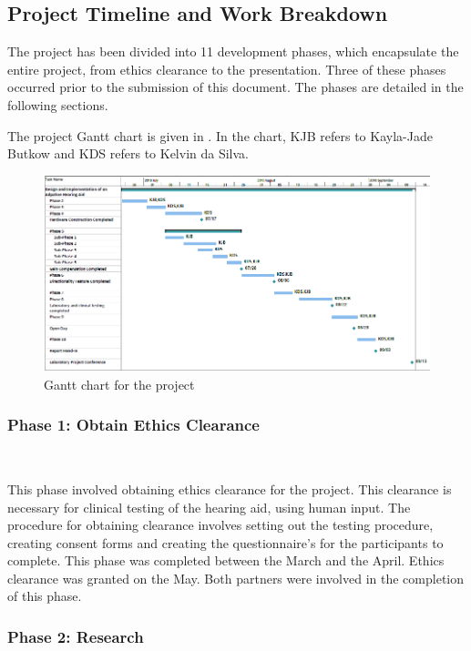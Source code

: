 \documentclass[10pt,twocolumn]{witseiepaper}
\begin{document}
\subsection{Project Timeline and Work Breakdown}
The project has been divided into 11 development phases, which encapsulate the entire project, from ethics clearance to the presentation. Three of these phases occurred prior to the submission of this document. The phases are detailed in the following sections.

The project Gantt chart is given in . In the chart, KJB refers to Kayla-Jade Butkow and KDS refers to Kelvin da Silva.

\begin{figure}[h]
	\centering
	\includegraphics[width=1\textwidth]{GanttChart.png}
	\caption{Gantt chart for the project}
	\raggedright
	\label{fig:ganttChart}	
\end{figure}

\subsubsection*{Phase 1: Obtain Ethics Clearance} $    $

This phase involved obtaining ethics clearance for the project. This clearance is necessary for clinical testing of the hearing aid, using human input. The procedure for obtaining clearance involves setting out the testing procedure, creating consent forms and creating the questionnaire's for the participants to complete. This phase was completed between the  March and the  April. Ethics clearance was granted on the  May. Both partners were involved in the completion of this phase.

\subsubsection*{Phase 2: Research} $    $
\end{document}
